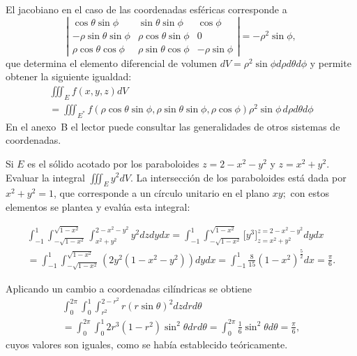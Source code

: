 El jacobiano en el caso de las coordenadas esféricas corresponde a
$$\left\vert
\begin{array}{ccc}
\cos \theta \sin \phi  & \sin \theta \sin \phi  & \cos \phi  \\
-\rho \sin \theta \sin \phi  & \rho \cos \theta \sin \phi  & 0 \\
\rho \cos \theta \cos \phi  & \rho \sin \theta \cos \phi  & -\rho \sin \phi
\end{array}\right\vert = -\rho ^{2}\sin \phi,$$
que determina el elemento diferencial de volumen $dV= \rho ^2 \sin \phi d\rho d\theta d\phi$
y permite obtener la siguiente igualdad:
\begin{multline}
\iiint_{E}f(x,y,z)dV \\ =\iiint_{E^{\ast }}f(\rho \cos \theta \sin \phi ,\rho
\sin \theta \sin \phi ,\rho \cos \phi )\rho ^{2}\sin \phi\, d\rho d\theta d\phi
\end{multline}
En el anexo~B el lector puede consultar las generalidades de otros sistemas de coordenadas.

\begin{ejemplo}
Si $E$ es el sólido acotado por los paraboloides $z=2-x^2-y^2$ y $z=x^2+y^2$.
Evaluar la integral $\displaystyle \iiint_E y^2 dV$. La intersección de los paraboloides está dada por $x^2+y^2=1$, que corresponde a un círculo unitario
en el plano $xy;$ con estos elementos se plantea y evalúa esta integral:

\begin{multline*}
\int_{-1}^{1}\int_{-\sqrt{1-x^{2}}}^{\sqrt{1-x^{2}}}\int_{x^{2}+y^{2}}^{2-x^{2}-y^{2}}y^{2}dzdydx = \int_{-1}^{1}\int_{-\sqrt{1-x^{2}}}^{\sqrt{1-x^{2}}}\bigg[ y^{3}\bigg]_{z=x^{2}+y^{2}}^{z=2-x^{2}-y^{2}} dydx \\
=\int_{-1}^{1}\int_{-\sqrt{1-x^{2}}}^{\sqrt{1-x^{2}}}\left( 2y^{2}\left(1-x^{2}-y^{2}\right) \right) dydx
= \int_{-1}^{1}\frac{8}{15}\left( 1-x^{2}\right) ^{\frac{5}{2}}dx= \frac{\pi}{6}.
\end{multline*}

Aplicando un cambio a coordenadas cilíndricas se obtiene
\begin{multline*}
\int_{0}^{2\pi }\int_{0}^{1}\int_{r^{2}}^{2-r^{2}}r\left( r\sin \theta\right) ^{2}dzdrd\theta \\
= \int_{0}^{2\pi}\int_{0}^{1}2r^{3}\left( 1-r^{2}\right) \sin ^{2}\theta drd\theta
= \int_{0}^{2\pi }\frac{1}{6}\sin ^{2}\theta d\theta = \frac{\pi}{6},
\end{multline*}
cuyos valores son iguales, como se había establecido teóricamente.
\end{ejemplo}

